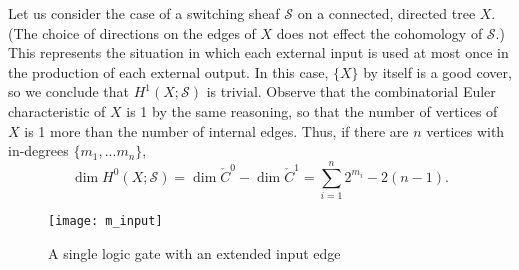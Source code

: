\documentclass{amsart}
\theoremstyle{plain}
\theoremstyle{definition}
\begin{document}
Let us consider the case of a switching sheaf $\mathcal{S}$ on a
connected, directed tree $X$.  (The choice of directions on the edges
of $X$ does not effect the cohomology of $\mathcal{S}$.)  This
represents the situation in which each external input is used at most
once in the production of each external output.  In this case, $\{X\}$
by itself is a good cover, so we conclude that $H^1(X;\mathcal{S})$ is
trivial.  Observe that the combinatorial Euler characteristic of $X$
is 1 by the same reasoning, so that the number of vertices of $X$ is 1
more than the number of internal edges.  Thus, if there are $n$ vertices with in-degrees $\{m_1, ... m_n\}$,
\begin{equation*}
\dim H^0(X;\mathcal{S})=\dim \check{C}^0- \dim \check{C}^1=\sum_{i=1}^n 2^{m_i} - 2(n-1).
\end{equation*}

\begin{figure}
\begin{center}
\texttt{[image: m\_input]}
\caption{A single logic gate with an extended input edge}
\label{m_input_fig}
\end{center}
\end{figure}
\end{document}

